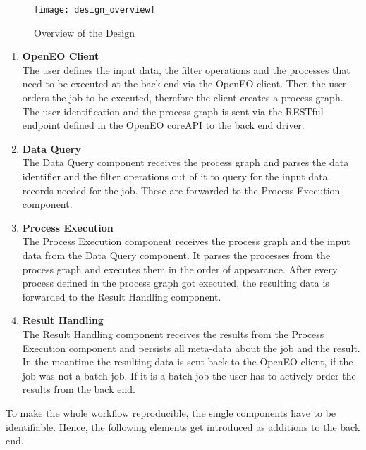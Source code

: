 \documentclass[draft,final]{vutinfth} %
\begin{document}
\begin{figure}[h]
	\centering
	\texttt{[image: design\_overview]}
	\caption{Overview of the Design}
	\label{fig:overview} 
\end{figure}

 \begin{enumerate}
	\item \textbf{OpenEO Client} \\
	The user defines the input data, the filter operations and the processes that need to be executed at the back end via the OpenEO client. Then the user orders the job to be executed, therefore the client creates a process graph. The user identification and the process graph is sent via the RESTful endpoint defined in the OpenEO coreAPI to the back end driver.  
	\item \textbf{Data Query} \\ 
	The Data Query component receives the process graph and parses the data identifier and the filter operations out of it to query for the input data records needed for the job. These are forwarded to the Process Execution component.  
	\item \textbf{Process Execution} \\
	The Process Execution component receives the process graph and the input data from the Data Query component. It parses the processes from the process graph and executes them in the order of appearance. After every process defined in the process graph got executed, the resulting data is forwarded to the Result Handling component.   
	\item \textbf{Result Handling} \\ 
	The Result Handling component receives the results from the Process Execution component and persists all meta-data about the job and the result. In the meantime the resulting data is sent back to the OpenEO client, if the job was not a batch job. If it is a batch job the user has to actively order the results from the back end.  
\end{enumerate}

To make the whole workflow reproducible, the single components have to be identifiable. Hence, the following elements get introduced as additions to the back end.
  
\end{document}
